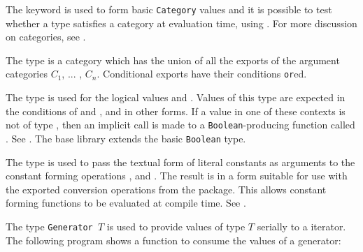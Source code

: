 The keyword  is used to form basic \verb+Category+ values
and it is possible to test whether a type satisfies a category at evaluation
time, using .
For more discussion on categories, see .

%
The type  is a category which has
the union of all the exports of the argument categories $C_1$, ... , $C_n$.
Conditional exports have their conditions \verb"or"ed.



The type  is used for the logical values  and
.  
Values of this type are expected in the conditions of
 and , and in other forms.
If a value in one of these contexts is not of type , then an
implicit call is made to a \verb+Boolean+-producing function called .
See .
The base \asharp{} library extends the basic \verb+Boolean+ type.

The type  is used to pass the textual form of
literal constants as arguments to the constant forming operations
,  and .
The result is in a form suitable for use with the exported conversion
operations from the  package.  
This allows constant forming functions to be evaluated at compile time.
See .

%
%
The type {\tt Generator $T$} is used to provide values of type $T$
serially to a  iterator.
The following program shows a function to consume the 
values of a generator:

